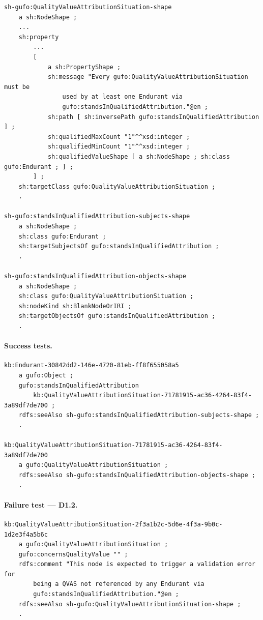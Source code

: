 \documentclass[12pt,a4paper]{article}
\begin{document}
\begin{lstlisting}[style=turtlestyle]
sh-gufo:QualityValueAttributionSituation-shape
    a sh:NodeShape ;
    ...
    sh:property
        ...
        [
            a sh:PropertyShape ;
            sh:message "Every gufo:QualityValueAttributionSituation must be
                used by at least one Endurant via
                gufo:standsInQualifiedAttribution."@en ;
            sh:path [ sh:inversePath gufo:standsInQualifiedAttribution ] ;
            sh:qualifiedMaxCount "1"^^xsd:integer ;
            sh:qualifiedMinCount "1"^^xsd:integer ;
            sh:qualifiedValueShape [ a sh:NodeShape ; sh:class gufo:Endurant ; ] ;
        ] ;
    sh:targetClass gufo:QualityValueAttributionSituation ;
    .

sh-gufo:standsInQualifiedAttribution-subjects-shape
    a sh:NodeShape ;
    sh:class gufo:Endurant ;
    sh:targetSubjectsOf gufo:standsInQualifiedAttribution ;
    .

sh-gufo:standsInQualifiedAttribution-objects-shape
    a sh:NodeShape ;
    sh:class gufo:QualityValueAttributionSituation ;
    sh:nodeKind sh:BlankNodeOrIRI ;
    sh:targetObjectsOf gufo:standsInQualifiedAttribution ;
    .
\end{lstlisting}

\paragraph{Success tests.}

\begin{lstlisting}[style=turtlestyle]
kb:Endurant-30842dd2-146e-4720-81eb-ff8f655058a5
    a gufo:Object ;
    gufo:standsInQualifiedAttribution
        kb:QualityValueAttributionSituation-71781915-ac36-4264-83f4-3a89df7de700 ;
    rdfs:seeAlso sh-gufo:standsInQualifiedAttribution-subjects-shape ;
    .

kb:QualityValueAttributionSituation-71781915-ac36-4264-83f4-3a89df7de700
    a gufo:QualityValueAttributionSituation ;
    rdfs:seeAlso sh-gufo:standsInQualifiedAttribution-objects-shape ;
    .
\end{lstlisting}

\paragraph{Failure test --- D1.2.}

\begin{lstlisting}[style=turtlestyle]
kb:QualityValueAttributionSituation-2f3a1b2c-5d6e-4f3a-9b0c-1d2e3f4a5b6c
    a gufo:QualityValueAttributionSituation ;
    gufo:concernsQualityValue "" ;
    rdfs:comment "This node is expected to trigger a validation error for
        being a QVAS not referenced by any Endurant via
        gufo:standsInQualifiedAttribution."@en ;
    rdfs:seeAlso sh-gufo:QualityValueAttributionSituation-shape ;
    .
\end{lstlisting}
\end{document}
